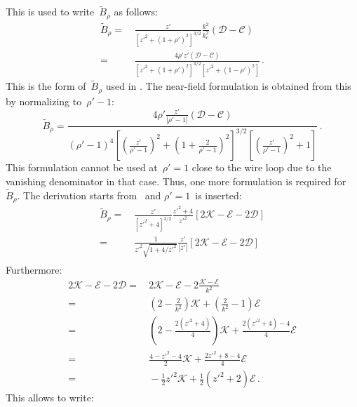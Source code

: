 This is used to write~$\tilde{B}_\rho$ as follows:
\begin{align}
  \tilde{B}_\rho
 =&\, \frac{z'}{\left[ z'^2 + (1 + \rho')^2 \right]^{3/2}} \frac{k^2}{k_c^2} \left(  \mathcal{D} - \mathcal{C} \right) \nonumber \\
 =&\, \frac{4 \rho' z' \left(  \mathcal{D} - \mathcal{C} \right) }{\left[ z'^2 + (1 + \rho')^2 \right]^{3/2} \left[ z'^2 + (1 - \rho')^2 \right]} \, .
\end{align}
This is the form of~$\tilde{B}_\rho$ used in .
The near-field formulation is obtained from this by normalizing to~$\rho'-1$:
\begin{equation}
  \tilde{B}_\rho
 = \frac{4 \rho' \frac{z'}{|\rho'-1|} \left( \mathcal{D} - \mathcal{C} \right) }
        {(\rho'-1)^4 \left[ \left(\frac{z'}{\rho'-1}\right)^2 + \left(1 + \frac{2}{\rho'-1}\right)^2 \right]^{3/2}
                     \left[ \left(\frac{z'}{\rho'-1}\right)^2 + 1 \right]} \, .
\end{equation}
This formulation cannot be used at~$\rho'=1$ close to the wire loop
due to the vanishing denominator in that case.
Thus, one more formulation is required for~$\tilde{B}_\rho$.
The derivation starts from~ and $\rho'=1$~is inserted:
\begin{align}
  \tilde{B}_\rho
 =&\, \frac{z'}{\left[ z'^2 + 4 \right]^{3/2}} \frac{z'^2 + 4}{z'^2} \left[ 2 \mathcal{K} - \mathcal{E} - 2 \mathcal{D} \right] \nonumber \\
 =&\, \frac{1}{z'^2 \sqrt{1 + 4/z'^2}} \frac{z'}{|z'|} \left[ 2 \mathcal{K} - \mathcal{E} - 2 \mathcal{D} \right] \nonumber \\
\end{align}
Furthermore:
\begin{align}
      2 \mathcal{K} - \mathcal{E} - 2 \mathcal{D}
 =&\, 2 \mathcal{K} - \mathcal{E} - 2 \frac{\mathcal{K} - \mathcal{E}}{k^2} \nonumber \\
 =&\, \left( 2 - \frac{2}{k^2} \right) \mathcal{K} + \left( \frac{2}{k^2} - 1 \right) \mathcal{E} \nonumber \\
 =&\, \left( 2 - \frac{2(z'^2+4)}{4} \right) \mathcal{K} + \frac{2(z'^2+4) - 4}{4} \mathcal{E} \nonumber \\
 =&\, \frac{4 - z'^2 -4}{2} \mathcal{K} + \frac{2 z'^2 + 8 - 4}{4} \mathcal{E} \nonumber \\
 =&\, -\frac{1}{2} z'^2 \mathcal{K} + \frac{1}{2}\left(z'^2 +2\right) \mathcal{E} \, .
\end{align}
This allows to write:
